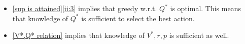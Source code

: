 \begin{remark}\leavevmode
	\begin{itemize}
	\item \ref{sup is attained}\ref{ii:3} implies that greedy w.r.t. \(Q^*\) is optimal. 
	This means that knowledge of \(Q^*\) is sufficient to select the best action.
	\item \ref{V*,Q* relation} implies that knowledge of \(V^*,r,p\) is sufficient as well.
	\end{itemize}
\end{remark}
\endinput
